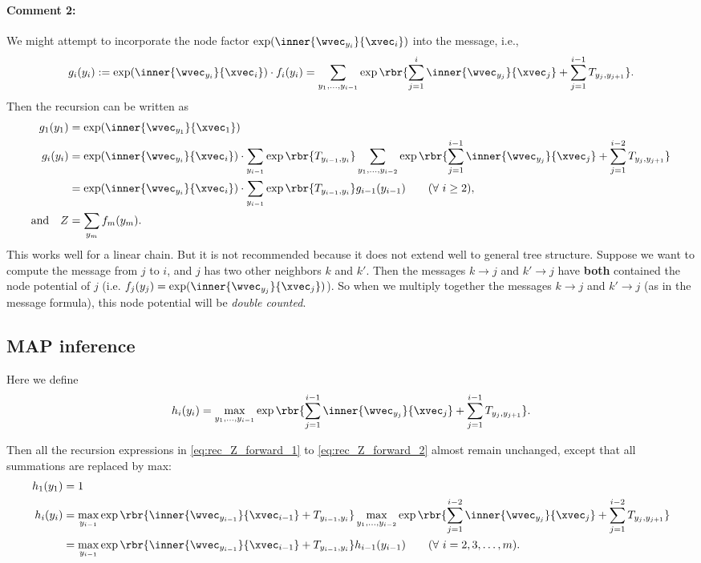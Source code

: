\documentclass[11pt]{report}
\begin{document}
\paragraph{Comment 2:}
We might attempt to incorporate the node factor $\exp(\inner{\wvec_{y_i}}{\xvec_i})$ into the message, i.e.,
\begin{align}
g_i(y_i) := \exp(\inner{\wvec_{y_i}}{\xvec_i}) \cdot f_i(y_i) = \sum_{y_1, \ldots, y_{i-1}} \exp \rbr{\sum_{j=1}^{i} \inner{\wvec_{y_j}}{\xvec_j} + \sum_{j=1}^{i-1} T_{y_j, y_{j+1}}}.
\end{align}
Then the recursion can be written as
\begin{align}
	g_1(y_1) &= \exp(\inner{\wvec_{y_1}}{\xvec_1}) \\
	g_i(y_i) &= \exp(\inner{\wvec_{y_i}}{\xvec_i}) \cdot \sum_{y_{i-1}} \exp \rbr{T_{y_{i-1}, y_i}}
	\sum_{y_1, \ldots, y_{i-2}} \exp \rbr{\sum_{j=1}^{i-1} \inner{\wvec_{y_j}}{\xvec_j} + \sum_{j=1}^{i-2} T_{y_j, y_{j+1}}} \\
	&= \exp(\inner{\wvec_{y_i}}{\xvec_i}) \cdot \sum_{y_{i-1}} \exp \rbr{T_{y_{i-1}, y_i}}  g_{i-1}(y_{i-1})  \qquad (\forall\ i \ge 2), \\
	\text{and} \quad Z &= \sum_{y_m} f_m(y_m).
\end{align}
This works well for a linear chain.
But it is not recommended because it does not extend well to general tree structure.
Suppose we want to compute the message from $j$ to $i$, and $j$ has two other neighbors $k$ and $k'$.
Then the messages $k \to j$ and $k' \to j$ have \textbf{both} contained the node potential of $j$ (i.e. $f_j(y_j) = \exp (\inner{\wvec_{y_j}}{\xvec_j})$).
So when we multiply together the messages $k \to j$ and $k' \to j$ (as in the message formula),
this node potential will be \emph{double counted}.

\subsection{MAP inference}
Here we define
\begin{align}
h_i(y_i) = \max_{y_1, \ldots, y_{i-1}} \exp \rbr{\sum_{j=1}^{i-1} \inner{\wvec_{y_j}}{\xvec_j} + \sum_{j=1}^{i-1} T_{y_j, y_{j+1}}}.
\end{align}

Then all the recursion expressions in \eqref{eq:rec_Z_forward_1}	to \eqref{eq:rec_Z_forward_2} almost remain unchanged,
except that all summations are replaced by max:
\begin{align}
\label{eq:rec_MAP_forward_1}
h_1(y_1) &= 1 \\
h_i(y_i) &= \max_{y_{i-1}} \exp \rbr{\inner{\wvec_{y_{i-1}}}{\xvec_{i-1}} + T_{y_{i-1}, y_i}}
\max_{y_1, \ldots, y_{i-2}} \exp \rbr{\sum_{j=1}^{i-2} \inner{\wvec_{y_j}}{\xvec_j} + \sum_{j=1}^{i-2} T_{y_j, y_{j+1}}} \\
\label{eq:rec_MAP_forward_2}	
&= \max_{y_{i-1}} \exp \rbr{\inner{\wvec_{y_{i-1}}}{\xvec_{i-1}} + T_{y_{i-1}, y_i}}  h_{i-1}(y_{i-1})  \qquad (\forall\ i = 2, 3, \ldots, m).
\end{align}
\end{document}
